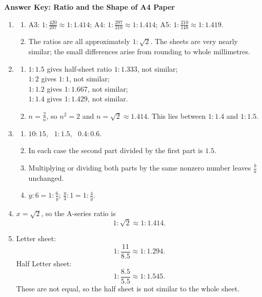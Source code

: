 \documentclass[11pt,a4paper]{article}
\begin{document}
\begin{center}
{\Large\bfseries Answer Key: Ratio and the Shape of A4 Paper}
\end{center}

\begin{enumerate}[label=\textbf{Q\arabic*.}, leftmargin=*, itemsep=0.8em]

\item
\begin{enumerate}[label=(\alph*)]
\item A3: \(1:\frac{420}{297}\approx 1:1.414\); \quad
A4: \(1:\frac{297}{210}\approx 1:1.414\); \quad
A5: \(1:\frac{210}{148}\approx 1:1.419\).
\item The ratios are all approximately \(1:\sqrt2\). The sheets are very nearly similar; the small differences arise from rounding to whole millimetres.
\end{enumerate}

\item
\begin{enumerate}[label=(\alph*)]
\item \(1:1.5\) gives half-sheet ratio \(1:1.333\), not similar; \\
\(1:2\) gives \(1:1\), not similar; \\
\(1:1.2\) gives \(1:1.667\), not similar; \\
\(1:1.4\) gives \(1:1.429\), not similar.
\item \(n=\frac2n\), so \(n^2=2\) and \(n=\sqrt2\approx1.414\). This lies between \(1:1.4\) and \(1:1.5\).
\end{enumerate}

\item
\begin{enumerate}[label=(\alph*)]
\item \(10:15\), \ \(1:1.5\), \ \(0.4:0.6\).
\item In each case the second part divided by the first part is \(1.5\).
\item Multiplying or dividing both parts by the same nonzero number leaves \(\frac{b}{a}\) unchanged.
\item \(y:6=1:\frac6y\); \quad \(\frac y4:1=1:\frac4y\).
\end{enumerate}

\item
\(x=\sqrt2\), so the A-series ratio is
\[
1:\sqrt2\approx1:1.414.
\]

\item
Letter sheet:
\[
1:\frac{11}{8.5}\approx1:1.294.
\]
Half Letter sheet:
\[
1:\frac{8.5}{5.5}\approx1:1.545.
\]
These are not equal, so the half sheet is not similar to the whole sheet.


\end{enumerate}
\end{document}
